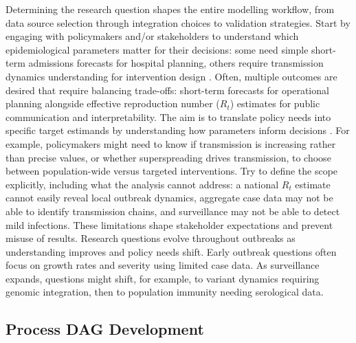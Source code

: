 \documentclass{article}
\begin{document}
Determining the research question shapes the entire modelling workflow, from data source selection through integration choices to validation strategies.
Start by engaging with policymakers and/or stakeholders to understand which epidemiological parameters matter for their decisions: some need simple short-term admissions forecasts for hospital planning, others require transmission dynamics understanding for intervention design \citep{marshall2024when}.
Often, multiple outcomes are desired that require balancing trade-offs: short-term forecasts for operational planning alongside effective reproduction number ($R_t$) estimates for public communication and interpretability.
The aim is to translate policy needs into specific target estimands by understanding how parameters inform decisions \citep{nicholson2022interoperability, gip-2024-ru}.
For example, policymakers might need to know if transmission is increasing rather than precise values, or whether superspreading drives transmission, to choose between population-wide versus targeted interventions.
Try to define the scope explicitly, including what the analysis cannot address: a national $R_t$ estimate cannot easily reveal local outbreak dynamics, aggregate case data may not be able to identify transmission chains, and surveillance may not be able to detect mild infections.
These limitations shape stakeholder expectations and prevent misuse of results.
Research questions evolve throughout outbreaks as understanding improves and policy needs shift.
Early outbreak questions often focus on growth rates and severity using limited case data.
As surveillance expands, questions might shift, for example, to variant dynamics requiring genomic integration, then to population immunity needing serological data.

\subsection{Process DAG Development} \label{sec:process}
\end{document}
